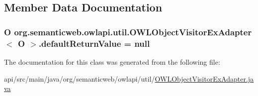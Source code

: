 \subsection{Member Data Documentation}
\hypertarget{classorg_1_1semanticweb_1_1owlapi_1_1util_1_1_o_w_l_object_visitor_ex_adapter_3_01_o_01_4_a7bb72ed6adf4f306bbeefa524c0bca79}{
\subsubsection[{default\-Return\-Value}]{\setlength{\rightskip}{0pt plus 5cm}O org.\-semanticweb.\-owlapi.\-util.\-O\-W\-L\-Object\-Visitor\-Ex\-Adapter$<$ O $>$.default\-Return\-Value = null\hspace{0.3cm}{\ttfamily [private]}}}\label{classorg_1_1semanticweb_1_1owlapi_1_1util_1_1_o_w_l_object_visitor_ex_adapter_3_01_o_01_4_a7bb72ed6adf4f306bbeefa524c0bca79}


The documentation for this class was generated from the following file\-:\begin{DoxyCompactItemize}
\item 
api/src/main/java/org/semanticweb/owlapi/util/\hyperlink{_o_w_l_object_visitor_ex_adapter_8java}{O\-W\-L\-Object\-Visitor\-Ex\-Adapter.\-java}\end{DoxyCompactItemize}
